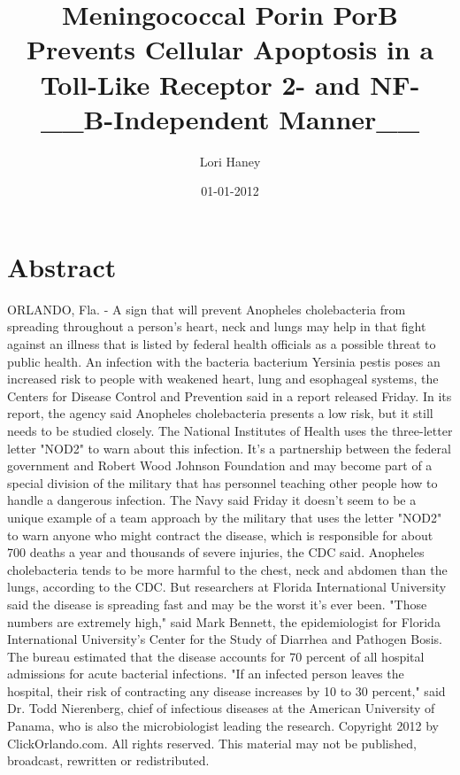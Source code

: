 \documentclass{article}%
\title{Meningococcal Porin PorB Prevents Cellular Apoptosis in a Toll{-}Like Receptor 2{-} and NF{-}\_\_B{-}Independent Manner\_\_}%
\author{Lori Haney}%
\affil{Anesthesia Department, the Second Affiliated Hospital, School of Medicine, Xi'an Jiaotong University, Xi'an, P. R. China}%
\date{01{-}01{-}2012}%
\begin{document}
%
\normalsize%
\maketitle%
\section{Abstract}%
\label{sec:Abstract}%
ORLANDO, Fla. {-} A sign that will prevent Anopheles cholebacteria from spreading throughout a person's heart, neck and lungs may help in that fight against an illness that is listed by federal health officials as a possible threat to public health.\newline%
An infection with the bacteria bacterium Yersinia pestis poses an increased risk to people with weakened heart, lung and esophageal systems, the Centers for Disease Control and Prevention said in a report released Friday. In its report, the agency said Anopheles cholebacteria presents a low risk, but it still needs to be studied closely.\newline%
The National Institutes of Health uses the three{-}letter letter "NOD2" to warn about this infection. It's a partnership between the federal government and Robert Wood Johnson Foundation and may become part of a special division of the military that has personnel teaching other people how to handle a dangerous infection.\newline%
The Navy said Friday it doesn't seem to be a unique example of a team approach by the military that uses the letter "NOD2" to warn anyone who might contract the disease, which is responsible for about 700 deaths a year and thousands of severe injuries, the CDC said.\newline%
Anopheles cholebacteria tends to be more harmful to the chest, neck and abdomen than the lungs, according to the CDC.\newline%
But researchers at Florida International University said the disease is spreading fast and may be the worst it's ever been.\newline%
"Those numbers are extremely high," said Mark Bennett, the epidemiologist for Florida International University's Center for the Study of Diarrhea and Pathogen Bosis.\newline%
The bureau estimated that the disease accounts for 70 percent of all hospital admissions for acute bacterial infections.\newline%
"If an infected person leaves the hospital, their risk of contracting any disease increases by 10 to 30 percent," said Dr. Todd Nierenberg, chief of infectious diseases at the American University of Panama, who is also the microbiologist leading the research.\newline%
Copyright 2012 by ClickOrlando.com. All rights reserved. This material may not be published, broadcast, rewritten or redistributed.
\end{document}
